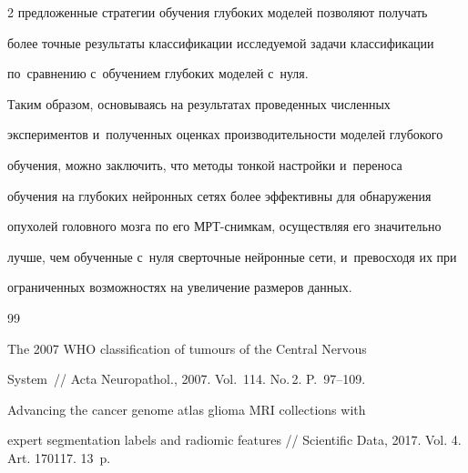 \begin{multicols}{2}
предложенные стратегии обуче\-ния глубоких моделей позволяют получать 

более точные результаты классификации ис\-сле\-ду\-емой задачи классификации 

по~сравнению с~обуче\-ни\-ем глубоких моделей с~\mbox{нуля}. 

{



}

  

  Таким образом, основываясь на результатах проведенных численных 

экспериментов и~полученных оценках производительности моделей глубокого 

обучения, можно заключить, что методы тонкой настройки и~переноса 

обучения на глубоких нейронных сетях более эффективны для обнаружения 

опухолей головного мозга по его МРТ-сним\-кам, осуществляя его значительно 

лучше, чем обученные с~нуля сверточные нейронные сети, и~превосходя их при 

ограниченных возможностях на увеличение размеров данных. 

  

{\small\frenchspacing

{%


\begin{thebibliography}{99}


 The 2007 WHO classification of tumours of the Central Nervous 

System~// Acta Neuropathol., 2007. Vol.~114. No.\,2. P.~97--109.


 Advancing the cancer genome atlas glioma MRI collections with 

expert segmentation labels and radiomic features // Scientific Data, 2017. Vol. 4. Art. 170117. 13~p.



\end{thebibliography}}}
\end{multicols}
